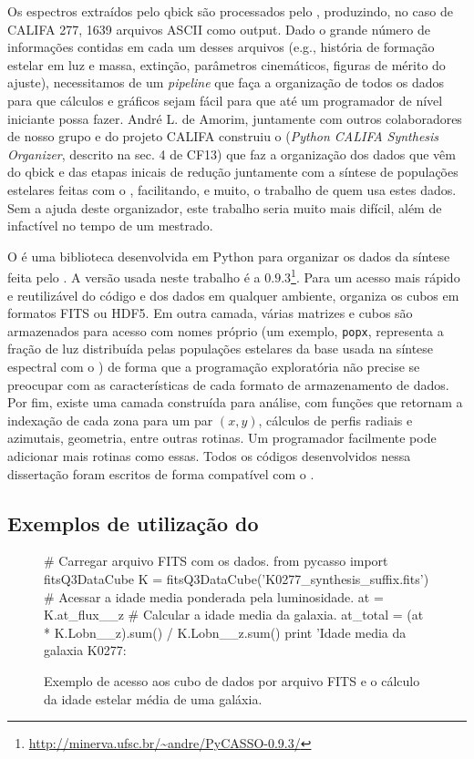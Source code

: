 Os espectros extraídos pelo {\sc qbick} são processados pelo \starlight, produzindo, no caso de CALIFA 277, 1639
arquivos ASCII como output. Dado o grande número de informações contidas em cada um desses arquivos (e.g., história de
formação estelar em luz e massa, extinção, parâmetros cinemáticos, figuras de mérito do ajuste), necessitamos de um
{\em pipeline} que faça a organização de todos os dados para que cálculos e gráficos sejam fácil para que até um programador
de nível iniciante possa fazer. André L. de Amorim, juntamente com outros colaboradores de nosso grupo e do projeto
CALIFA construiu o \pycasso ({\em Python CALIFA \starlight Synthesis Organizer}, descrito na sec. 4 de CF13) que faz a
organização dos dados que vêm do {\sc qbick} e das etapas inicais de redução juntamente com a síntese de populações
estelares feitas com o \starlight, facilitando, e muito, o trabalho de quem usa estes dados. Sem a ajuda deste
organizador, este trabalho seria muito mais difícil, além de infactível no tempo de um mestrado.

O \pycasso é uma biblioteca desenvolvida em Python para organizar os dados da síntese feita pelo \starlight. A versão
usada neste trabalho é a $0.9.3$\footnote{\url{http://minerva.ufsc.br/~andre/PyCASSO-0.9.3/}}. Para um acesso mais
rápido e reutilizável do código e dos dados em qualquer ambiente, organiza os cubos em formatos FITS ou HDF5. Em outra
camada, várias matrizes e cubos são armazenados para acesso com nomes próprio (um exemplo, \texttt{popx}, representa a
fração de luz distribuída pelas populações estelares da base usada na síntese espectral com o \starlight) de forma que a
programação exploratória não precise se preocupar com as características de cada formato de armazenamento de dados. Por
fim, existe uma camada construída para análise, com funções que retornam a indexação de cada zona para um par $(x, y)$,
cálculos de perfis radiais e azimutais, geometria, entre outras rotinas. Um programador facilmente pode adicionar mais
rotinas como essas. Todos os códigos desenvolvidos nessa dissertação foram escritos de forma compatível com o \pycasso.

\subsection{Exemplos de utilização do \pycasso}

\begin{figure}
	\begin{python}
# Carregar arquivo FITS com os dados.
from pycasso import fitsQ3DataCube
K = fitsQ3DataCube('K0277_synthesis_suffix.fits')
# Acessar a idade media ponderada pela luminosidade.
at = K.at_flux__z
# Calcular a idade media da galaxia.
at_total = (at * K.Lobn__z).sum() / K.Lobn__z.sum()
print 'Idade media da galaxia K0277: %
	\end{python}
	\caption[Exemplo de programa utilizando \pycasso.]
	{Exemplo de acesso aos cubo de dados por arquivo FITS e o cálculo da idade estelar média de uma galáxia.}
	\label{fig:dataAccess}
\end{figure}

